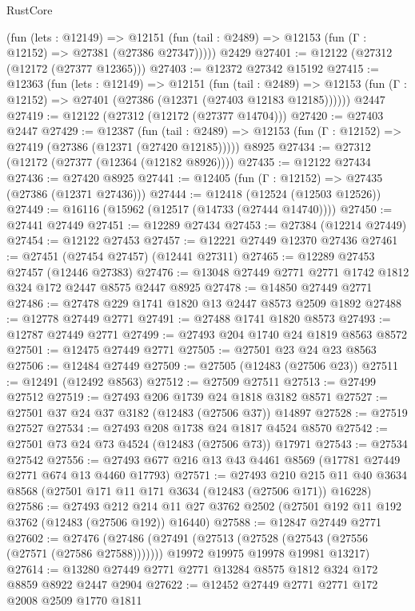\begin{lexlean}{RustCore}
\begin{coremodule}
      (fun (lets : @12149) =>
      @12151 (fun (tail : @2489) => @12153 (fun (Γ : @12152) => @27381 (@27386 @27347)))))
    @2429
@27401 := @12122 (@27312 (@12172 (@27377 @12365)))
@27403 := @12372 @27342 @15192
@27415 := @12363
    (fun (lets : @12149) =>
    @12151
      (fun (tail : @2489) =>
      @12153 (fun (Γ : @12152) => @27401 (@27386 (@12371 (@27403 @12183 @12185))))))
    @2447
@27419 := @12122 (@27312 (@12172 (@27377 @14704)))
@27420 := @27403 @2447
@27429 := @12387
    (fun (tail : @2489) => @12153 (fun (Γ : @12152) => @27419 (@27386 (@12371 (@27420 @12185)))))
    @8925
@27434 := @27312 (@12172 (@27377 (@12364 (@12182 @8926))))
@27435 := @12122 @27434
@27436 := @27420 @8925
@27441 := @12405 (fun (Γ : @12152) => @27435 (@27386 (@12371 @27436)))
@27444 := @12418 (@12524 (@12503 @12526))
@27449 := @16116 (@15962 (@12517 (@14733 (@27444 @14740))))
@27450 := @27441 @27449
@27451 := @12289 @27434
@27453 := @27384 (@12214 @27449)
@27454 := @12122 @27453
@27457 := @12221 @27449 @12370 @27436
@27461 := @27451 (@27454 @27457) (@12441 @27311)
@27465 := @12289 @27453 @27457 (@12446 @27383)
@27476 := @13048 @27449 @2771 @2771 @1742 @1812 @324 @172 @2447 @8575 @2447 @8925
@27478 := @14850 @27449 @2771
@27486 := @27478 @229 @1741 @1820 @13 @2447 @8573 @2509 @1892
@27488 := @12778 @27449 @2771
@27491 := @27488 @1741 @1820 @8573
@27493 := @12787 @27449 @2771
@27499 := @27493 @204 @1740 @24 @1819 @8563 @8572
@27501 := @12475 @27449 @2771
@27505 := @27501 @23 @24 @23 @8563
@27506 := @12484 @27449
@27509 := @27505 (@12483 (@27506 @23))
@27511 := @12491 (@12492 @8563)
@27512 := @27509 @27511
@27513 := @27499 @27512
@27519 := @27493 @206 @1739 @24 @1818 @3182 @8571
@27527 := @27501 @37 @24 @37 @3182 (@12483 (@27506 @37)) @14897
@27528 := @27519 @27527
@27534 := @27493 @208 @1738 @24 @1817 @4524 @8570
@27542 := @27501 @73 @24 @73 @4524 (@12483 (@27506 @73)) @17971
@27543 := @27534 @27542
@27556 := @27493 @677 @216 @13 @43 @4461 @8569 (@17781 @27449 @2771 @674 @13 @4460 @17793)
@27571 := @27493
    @210
    @215
    @11
    @40
    @3634
    @8568
    (@27501 @171 @11 @171 @3634 (@12483 (@27506 @171)) @16228)
@27586 := @27493
    @212
    @214
    @11
    @27
    @3762
    @2502
    (@27501 @192 @11 @192 @3762 (@12483 (@27506 @192)) @16440)
@27588 := @12847 @27449 @2771
@27602 := @27476
    (@27486
      (@27491 (@27513 (@27528 (@27543 (@27556 (@27571 (@27586 @27588)))))))
      @19972
      @19975
      @19978
      @19981
      @13217)
@27614 := @13280 @27449 @2771 @2771 @13284 @8575 @1812 @324 @172 @8859 @8922 @2447 @2904
@27622 := @12452 @27449 @2771 @2771 @172 @2008 @2509 @1770 @1811

\end{coremodule}
\end{lexlean}
